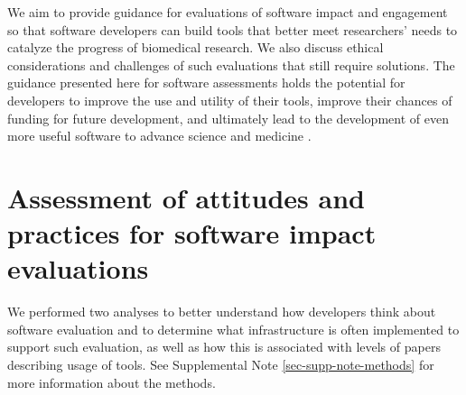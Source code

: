 \documentclass{article}
\begin{document}
We aim to provide guidance for evaluations of software impact and engagement so that software developers can build tools that better meet researchers' needs to catalyze the progress of biomedical research. We also discuss ethical considerations and challenges of such evaluations that still require solutions. The guidance presented here for software assessments holds the potential for developers to improve the use and utility of their tools, improve their chances of funding for future development, and ultimately lead to the development of even more useful software to advance science and medicine \cite{wratten_reproducible_2021}. 



\section{Assessment of attitudes and practices for software impact evaluations}

We performed two analyses to better understand how developers think about software evaluation and to determine what infrastructure is often implemented to support such evaluation, as well as how this is associated with levels of papers describing usage of tools. See Supplemental Note \ref{sec-supp-note-methods} for more information about the methods. 
\end{document}
